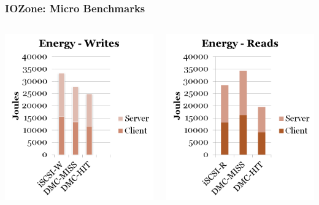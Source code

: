 \documentclass{beamer}
\begin{document}
\begin{frame}
  \frametitle{IOZone: Micro Benchmarks}

  \begin{columns}
    \begin{column}{0.5\textwidth}
      \includegraphics[width=\textwidth]{energy-writes.png}
    \end{column}
    \begin{column}{0.5\textwidth}
      \includegraphics[width=\textwidth]{energy-reads.png}
    \end{column}
  \end{columns}


\end{frame}
\end{document}
